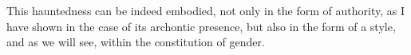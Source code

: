 This hauntedness can be indeed embodied, not only in the form of authority, as I have shown in the case of its archontic presence, but also in the form of a style, and as we will see, within the constitution of gender.



